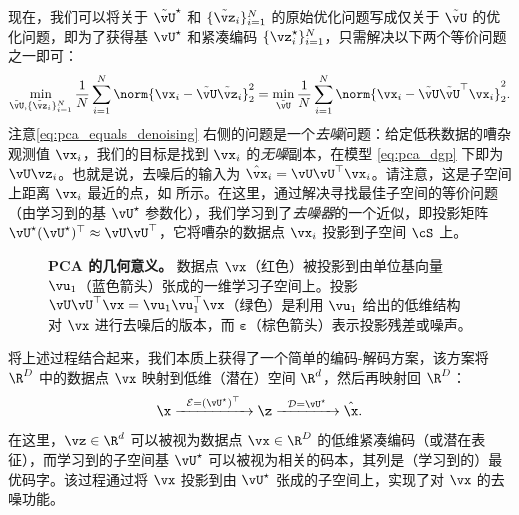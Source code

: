 \documentclass[../../book-main_zh.tex]{subfiles}
\begin{document}
现在，我们可以将关于 \(\tilde{\vU}^{\star}\) 和 \(\{\tilde{\vz}_{i}\}_{i =
1}^{N}\) 的原始优化问题写成仅关于 \(\tilde{\vU}\) 的优化问题，即为了获得基 \(\vU^{\star}\)
和紧凑编码 \(\{\vz_{i}^{\star}\}_{i = 1}^{N}\)，只需解决以下两个等价问题之一即可：
\begin{equation}\label{eq:pca_equals_denoising}
    \min_{\tilde{\vU}, \{\tilde{\vz}_{i}\}_{i =
    1}^{N}}\frac{1}{N}\sum_{i = 1}^{N}\norm{\vx_{i} -
    \tilde{\vU}\tilde{\vz}_{i}}_{2}^{2} =
    \min_{\tilde{\vU}}\frac{1}{N}\sum_{i = 1}^{N}\norm{\vx_{i} -
    \tilde{\vU}\tilde{\vU}^{\top}\vx_{i}}_{2}^{2}.
\end{equation}
注意\eqref{eq:pca_equals_denoising}
右侧的问题是一个\textit{去噪}问题：给定低秩数据的嘈杂观测值 \(\vx_{i}\)，我们的目标是找到 \(\vx_{i}\)
的\textit{无噪}副本，在模型 \eqref{eq:pca_dgp} 下即为 $\vU\vz_{i}$。也就是说，去噪后的输入为
$\hat{\vx}_i = \vU\vU^\top \vx_i$。请注意，这是子空间上距离 $\vx_i$ 最近的点，如
 所示。在这里，通过解决寻找最佳子空间的等价问题（由学习到的基
\(\vU^{\star}\) 参数化），我们学习到了\textit{去噪器}的一个近似，即投影矩阵
\(\vU^{\star}(\vU^{\star})^{\top} \approx \vU\vU^{\top}\)，它将嘈杂的数据点
$\vx_i$ 投影到子空间 \(\cS\) 上。 %

\begin{figure}
    \centering
    \caption{\small \textbf{PCA 的几何意义。} 数据点 $\vx$（红色）被投影到由单位基向量
        $\vu_1$（蓝色箭头）张成的一维学习子空间上。投影 $\vU\vU^\top\vx =
        \vu_{1}\vu_{1}^{\top}\vx$（绿色）是利用 $\vu_{1}$ 给出的低维结构对 $\vx$
    进行去噪后的版本，而 $\boldsymbol{\varepsilon}$（棕色箭头）表示投影残差或噪声。}
    \label{fig:pca-geometry}
\end{figure}

将上述过程结合起来，我们本质上获得了一个简单的编码-解码方案，该方案将 $\R^D$ 中的数据点 $\vx$ 映射到低维（潜在）空间
$\R^d$，然后再映射回 $\R^D$：
\begin{equation}
    \x \xrightarrow{\hspace{2mm} \mathcal{E} = (\vU^\star)^\top
    \hspace{2mm}}  \z
    \xrightarrow{\hspace{2mm} \mathcal{D} = \vU^\star \hspace{2mm}}   \hat{\x}.
    \label{eqn:autoencoding-PCA}
\end{equation}
在这里，$\vz \in \R^d$ 可以被视为数据点 $\vx \in \R^D$ 的低维紧凑编码（或潜在表征），而学习到的子空间基
$\vU^\star$ 可以被视为相关的码本，其列是（学习到的）最优码字。该过程通过将 $\vx$ 投影到由 $\vU^\star$
张成的子空间上，实现了对 $\vx$ 的去噪功能。
\end{document}

